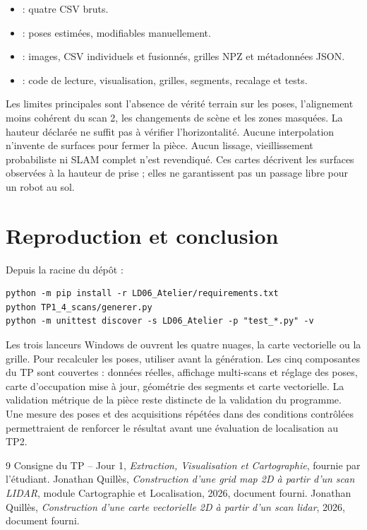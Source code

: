 \documentclass[11pt,a4paper]{article}
\begin{document}
\begin{itemize}
\item {} : quatre CSV bruts.
\item {} : poses estimées, modifiables manuellement.
\item {} : images, CSV individuels et fusionnés, grilles NPZ et métadonnées JSON.
\item {} : code de lecture, visualisation, grilles, segments, recalage et tests.
\end{itemize}
Les limites principales sont l'absence de vérité terrain sur les poses, l'alignement moins cohérent du scan 2, les changements de scène et les zones masquées. La hauteur déclarée ne suffit pas à vérifier l'horizontalité. Aucune interpolation n'invente de surfaces pour fermer la pièce. Aucun lissage, vieillissement probabiliste ni SLAM complet n'est revendiqué. Ces cartes décrivent les surfaces observées à la hauteur de prise ; elles ne garantissent pas un passage libre pour un robot au sol.

\section{Reproduction et conclusion}
Depuis la racine du dépôt :
\begin{verbatim}
python -m pip install -r LD06_Atelier/requirements.txt
python TP1_4_scans/generer.py
python -m unittest discover -s LD06_Atelier -p "test_*.py" -v
\end{verbatim}
Les trois lanceurs Windows de  ouvrent les quatre nuages, la carte vectorielle ou la grille. Pour recalculer les poses, utiliser  avant la génération.
Les cinq composantes du TP sont couvertes : données réelles, affichage multi-scans et réglage des poses, carte d'occupation mise à jour, géométrie des segments et carte vectorielle. La validation métrique de la pièce reste distincte de la validation du programme. Une mesure des poses et des acquisitions répétées dans des conditions contrôlées permettraient de renforcer le résultat avant une évaluation de localisation au TP2.

\begin{thebibliography}{9}
 Consigne du TP -- Jour 1, \emph{Extraction, Visualisation et Cartographie}, fournie par l'étudiant.
 Jonathan Quillès, \emph{Construction d'une grid map 2D à partir d'un scan LIDAR}, module Cartographie et Localisation, 2026, document fourni.
 Jonathan Quillès, \emph{Construction d'une carte vectorielle 2D à partir d'un scan lidar}, 2026, document fourni.
\end{thebibliography}
\end{document}
